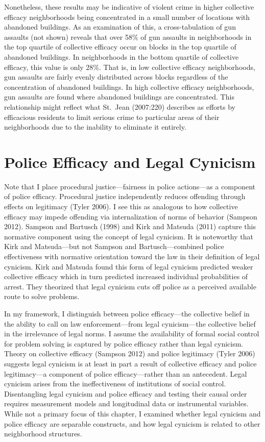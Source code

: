 \documentclass [11pt, proquest] {uwthesis}[2015/03/03]
\begin{document}
Nonetheless, these results may be indicative of violent crime in higher collective efficacy neighborhoods being concentrated in a small number of locations with abandoned buildings. As an examination of this, a cross-tabulation of gun assaults (not shown) reveals that over 58\% of gun assaults in neighborhoods in the top quartile of collective efficacy occur on blocks in the top quartile of abandoned buildings. In neighborhoods in the bottom quartile of collective efficacy, this value is only 28\%. That is, in low collective efficacy neighborhoods, gun assaults are fairly evenly distributed across blocks regardless of the concentration of abandoned buildings. In high collective efficacy neighborhoods, gun assaults are found where abandoned buildings are concentrated. This relationship might reflect what St.~Jean (2007:220) describes as efforts by efficacious residents to limit serious crime to particular areas of their neighborhoods due to the inability to eliminate it entirely.

\hypertarget{legalcynicism}{%
\chapter{Police Efficacy and Legal Cynicism}\label{legalcynicism}}

Note that I place procedural justice---fairness in police actions---as a component of police efficacy. Procedural justice independently reduces offending through effects on legitimacy (Tyler 2006). I see this as analogous to how collective efficacy may impede offending via internalization of norms of behavior (Sampson 2012). Sampson and Bartusch (1998) and Kirk and Matsuda (2011) capture this normative component using the concept of legal cynicism. It is noteworthy that Kirk and Matsuda---but not Sampson and Bartusch---combined police effectiveness with normative orientation toward the law in their definition of legal cynicism. Kirk and Matsuda found this form of legal cynicism predicted weaker collective efficacy which in turn predicted increased individual probabilities of arrest. They theorized that legal cynicism cuts off police as a perceived available route to solve problems.

In my framework, I distinguish between police efficacy---the collective belief in the ability to call on law enforcement---from legal cynicism---the collective belief in the irrelevance of legal norms. I assume the availability of formal social control for problem solving is captured by police efficacy rather than legal cynicism. Theory on collective efficacy (Sampson 2012) and police legitimacy (Tyler 2006) suggests legal cynicism is at least in part a result of collective efficacy and police legitimacy---a component of police efficacy---rather than an antecedent. Legal cynicism arises from the ineffectiveness of institutions of social control. Disentangling legal cynicism and police efficacy and testing their causal order requires measurement models and longitudinal data or instrumental variables. While not a primary focus of this chapter, I examined whether legal cynicism and police efficacy are separable constructs, and how legal cynicism is related to other neighborhood structures.
\end{document}
